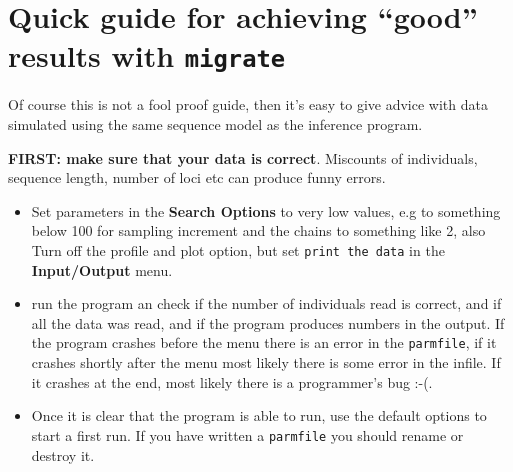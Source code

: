 \section{Quick guide for achieving ``good'' results with {\tt migrate}}
Of course this is not a fool proof guide, then it's easy to give advice with 
data simulated using the same sequence model as the inference program.
\par
{\bf FIRST: make sure that your data is correct}. Miscounts of individuals,
sequence length, number of loci etc can produce funny errors.
\begin{itemize}
\item Set parameters in the {\bf Search Options} to very low values, 
e.g to something
below 100 for sampling increment and the chains to something like 2, also
Turn off the profile and plot option, but set {\tt print the data}
 in the {\bf Input/Output} menu.
\item run the program an check if the number of individuals read is correct,
and if all the data was read, and if the program produces numbers 
in the output. If the program crashes before the menu there is an error 
in the {\tt parmfile}, if it crashes shortly after the menu most likely 
there is some error in
the infile. If it crashes at the end, most likely there is a programmer's 
bug :-(.
\item Once it is clear that the program is able to run, use the default options
to start a first run. If you have written a {\tt parmfile} you should rename 
or destroy it.
\end{itemize}

